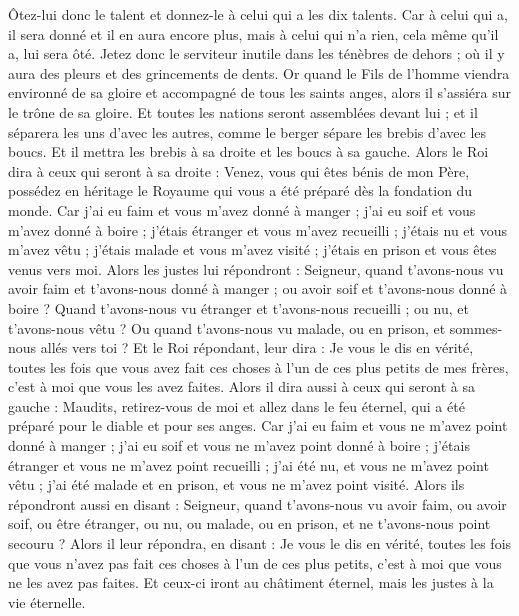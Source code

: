 \begin{multicols}{2}
Ôtez-lui donc le talent et donnez-le à celui qui a les dix talents.
Car à celui qui a, il sera donné et il en aura encore plus, mais à celui qui n'a rien, cela même qu'il a, lui sera ôté.
Jetez donc le serviteur inutile dans les ténèbres de dehors ; où il y aura des pleurs et des grincements de dents.
Or quand le Fils de l'homme viendra environné de sa gloire et accompagné de tous les saints anges, alors il s'assiéra sur le trône de sa gloire.
Et toutes les nations seront assemblées devant lui ; et il séparera les uns d'avec les autres, comme le berger sépare les brebis d'avec les boucs.
Et il mettra les brebis à sa droite et les boucs à sa gauche.
Alors le Roi dira à ceux qui seront à sa droite : Venez, vous qui êtes bénis de mon Père, possédez en héritage le Royaume qui vous a été préparé dès la fondation du monde.
Car j'ai eu faim et vous m'avez donné à manger ; j'ai eu soif et vous m'avez donné à boire ; j'étais étranger et vous m'avez recueilli ;
j'étais nu et vous m'avez vêtu ; j'étais malade et vous m'avez visité ; j'étais en prison et vous êtes venus vers moi.
Alors les justes lui répondront : Seigneur, quand t'avons-nous vu avoir faim et t'avons-nous donné à manger ; ou avoir soif et t'avons-nous donné à boire ?
Quand t'avons-nous vu étranger et t'avons-nous recueilli ; ou nu, et t'avons-nous vêtu ?
Ou quand t'avons-nous vu malade, ou en prison, et sommes-nous allés vers toi ?
Et le Roi répondant, leur dira : Je vous le dis en vérité, toutes les fois que vous avez fait ces choses à l'un de ces plus petits de mes frères, c'est à moi que vous les avez faites.
Alors il dira aussi à ceux qui seront à sa gauche : Maudits, retirez-vous de moi et allez dans le feu éternel, qui a été préparé pour le diable et pour ses anges.
Car j'ai eu faim et vous ne m'avez point donné à manger ; j'ai eu soif et vous ne m'avez point donné à boire ;
j'étais étranger et vous ne m'avez point recueilli ; j'ai été nu, et vous ne m'avez point vêtu ; j'ai été malade et en prison, et vous ne m'avez point visité.
Alors ils répondront aussi en disant : Seigneur, quand t'avons-nous vu avoir faim, ou avoir soif, ou être étranger, ou nu, ou malade, ou en prison, et ne t'avons-nous point secouru ?
Alors il leur répondra, en disant : Je vous le dis en vérité, toutes les fois que vous n'avez pas fait ces choses à l'un de ces plus petits, c'est à moi que vous ne les avez pas faites.
Et ceux-ci iront au châtiment éternel, mais les justes à la vie éternelle.

\end{multicols}
